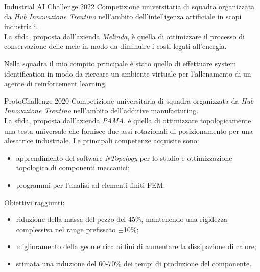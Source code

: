\documentclass[10pt,a4paper]{report}
\begin{document}
    \begin{project}
        {Industrial AI Challenge}
        {2022}
        Competizione universitaria di squadra organizzata da \textit{Hub Innovazione Trentino} nell'ambito dell'intelligenza artificiale in scopi industriali. \\
        La sfida, proposta dall'azienda \textit{Melinda}, è quella di ottimizzare il processo di conservazione delle mele in modo da diminuire i costi legati all'energia.

        Nella squadra il mio compito principale è stato quello di effettuare system identification in modo da ricreare un ambiente virtuale per l'allenamento di un agente di reinforcement learning.
    \end{project}

    \begin{project}
        {ProtoChallenge}
        {2020}
        Competizione universitaria di squadra organizzata da \textit{Hub Innovazione Trentino} nell'ambito dell'additive manufacturing. \\
        La sfida, proposta dall'azienda \textit{PAMA}, è quella di ottimizzare topologicamente una testa universale che fornisce due assi rotazionali di posizionamento per una alesatrice industriale. Le principali competenze acquisite sono:
        \begin{itemize}
            \item apprendimento del software \textit{NTopology} per lo studio e ottimizzazione topologica di componenti meccanici;
            \item programmi per l'analisi ad elementi finiti FEM.
        \end{itemize}
        Obiettivi raggiunti:
        \begin{itemize}
            \item riduzione della massa del pezzo del 45\%, mantenendo una rigidezza complessiva nel range prefissato $\pm$10\%;
            \item miglioramento della geometrica ai fini di aumentare la dissipazione di calore;
            \item stimata una riduzione del 60-70\% dei tempi di produzione del componente.
        \end{itemize}
    \end{project}
\end{document}

